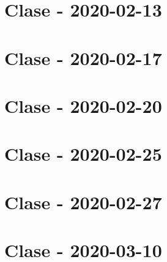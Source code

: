 \documentclass{book}
\begin{document}
\chapter{Clase - 2020-02-13}


\chapter{Clase - 2020-02-17}


\chapter{Clase - 2020-02-20}


\chapter{Clase - 2020-02-25}


\chapter{Clase - 2020-02-27}


\chapter{Clase - 2020-03-10}

\end{document}
